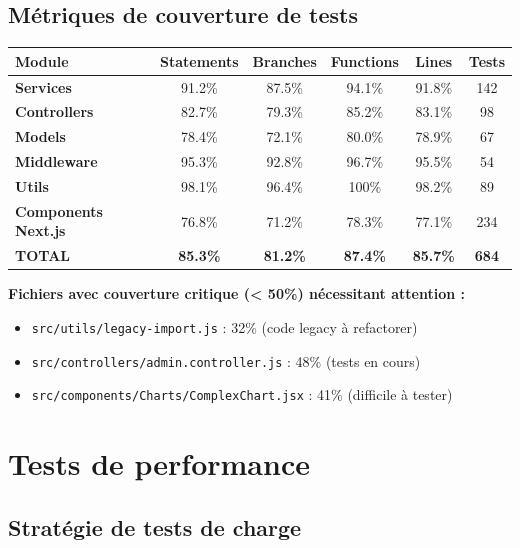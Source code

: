 \subsection{Métriques de couverture de tests}

\begin{tcolorbox}[colback=green!5!white,colframe=green!60!black,title=\textbf{Couverture de code actuelle (Février 2026)}]
\begin{center}
\begin{tabular}{|l|c|c|c|c|c|}
\hline
\textbf{Module} & \textbf{Statements} & \textbf{Branches} & \textbf{Functions} & \textbf{Lines} & \textbf{Tests} \\
\hline
\textbf{Services} & 91.2\% & 87.5\% & 94.1\% & 91.8\% & 142 \\
\hline
\textbf{Controllers} & 82.7\% & 79.3\% & 85.2\% & 83.1\% & 98 \\
\hline
\textbf{Models} & 78.4\% & 72.1\% & 80.0\% & 78.9\% & 67 \\
\hline
\textbf{Middleware} & 95.3\% & 92.8\% & 96.7\% & 95.5\% & 54 \\
\hline
\textbf{Utils} & 98.1\% & 96.4\% & 100\% & 98.2\% & 89 \\
\hline
\textbf{Components Next.js} & 76.8\% & 71.2\% & 78.3\% & 77.1\% & 234 \\
\hline
\hline
\textbf{TOTAL} & \textbf{85.3\%} & \textbf{81.2\%} & \textbf{87.4\%} & \textbf{85.7\%} & \textbf{684} \\
\hline
\end{tabular}
\end{center}

\textbf{Fichiers avec couverture critique (< 50\%) nécessitant attention :}
\begin{itemize}
    \item \texttt{src/utils/legacy-import.js} : 32\% (code legacy à refactorer)
    \item \texttt{src/controllers/admin.controller.js} : 48\% (tests en cours)
    \item \texttt{src/components/Charts/ComplexChart.jsx} : 41\% (difficile à tester)
\end{itemize}
\end{tcolorbox}

\section{Tests de performance}

\subsection{Stratégie de tests de charge}

